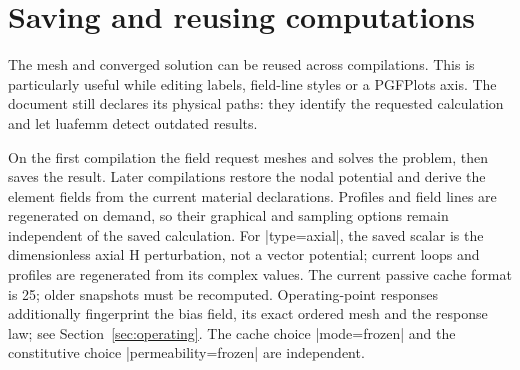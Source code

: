 \section{Saving and reusing computations}
\label{sec:cache}
The mesh and converged solution can be reused across compilations. This is
particularly useful while editing labels, field-line styles or a PGFPlots
axis. The document still declares its physical paths: they identify the
requested calculation and let luafemm detect outdated results.

\begin{codeexample}[width=5cm]
\end{codeexample}

On the first compilation the field request meshes and solves the problem,
then saves the result. Later compilations restore the nodal potential and
derive the element fields from the current material declarations. Profiles
and field lines are regenerated on demand, so their graphical and sampling
options remain independent of the saved calculation. For |type=axial|,
the saved scalar is the dimensionless axial H perturbation, not a vector
potential; current loops and profiles are regenerated from its complex values.
The current passive cache format is 25; older snapshots must be recomputed.
Operating-point responses additionally fingerprint the bias field, its exact
ordered mesh and the response law; see Section~\ref{sec:operating}. The cache
choice |mode=frozen| and the constitutive choice |permeability=frozen| are
independent.

